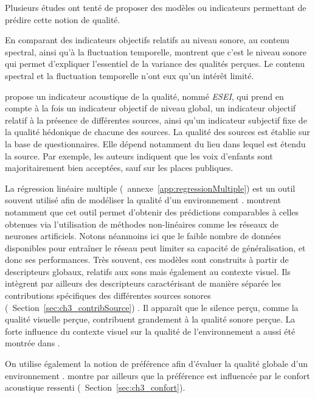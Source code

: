  
Plusieurs études ont tenté de proposer des modèles ou indicateurs permettant de prédire cette notion de qualité.

En comparant des indicateurs objectifs relatifs au niveau sonore, au contenu spectral, ainsi qu'à la fluctuation temporelle, \citep{nilsson2006soundscape,nilsson2007acoustic} montrent que c'est le niveau sonore qui permet d'expliquer l'essentiel de la variance des qualités perçues. Le contenu spectral et la fluctuation temporelle n'ont eux qu'un intérêt limité.

\citep{garcia2012validation} propose un indicateur acoustique de la qualité, nommé \emph{ESEI}, qui prend en compte à la fois un indicateur objectif de niveau global, un indicateur objectif relatif à la présence de différentes sources, ainsi qu'un indicateur subjectif fixe de la qualité hédonique de chacune des sources. La qualité des sources est établie sur la base de questionnaires. Elle dépend notamment du lieu dans lequel est étendu la source. Par exemple, les auteurs indiquent que les voix d'enfants sont majoritairement bien acceptées, sauf sur les places publiques.

La régression linéaire multiple (\cf~annexe~\ref{app:regressionMultiple}) est un outil souvent utilisé afin de modéliser la qualité d'un environnement \citep{ricciardi2015sound}. \citep{brocolini2012prediction} montrent notamment que cet outil permet d'obtenir des prédictions comparables à celles obtenues via l'utilisation de méthodes non-linéaires comme les réseaux de neurones artificiels. Notons néanmoins ici que le faible nombre de données disponibles pour entraîner le réseau peut limiter sa capacité de généralisation, et donc ses performances. Très souvent, ces modèles sont construits à partir de descripteurs globaux, relatifs aux sons mais également au contexte visuel. Ils intègrent par ailleurs des descripteurs caractérisant de manière séparée les contributions spécifiques des différentes sources sonores (\cf~Section~\ref{sec:ch3_contribSource}) \citep{ricciardi2015sound,brocolini2012prediction}. Il apparaît que le silence perçu,  comme la qualité visuelle perçue, contribuent grandement à la qualité sonore perçue. La forte influence du contexte visuel sur la qualité de l'environnement a aussi été montrée dans \citep{hong2013designing}.

On utilise également la notion de préférence afin d'évaluer la qualité globale d'un environnement \citep{yu2010factors}. \citep{hong2013designing} montre par ailleurs que la préférence est influencée par le confort acoustique ressenti (\cf~Section~\ref{sec:ch3_confort}).\\

